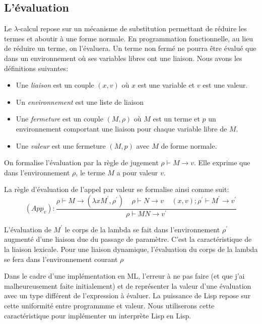 \documentclass[11pt]{book}
\begin{document}
\subsection{L'évaluation}
Le $\lambda$-calcul repose sur un mécanisme de substitution permettant de réduire les termes et
aboutir à une forme normale. En programmation fonctionnelle, au lieu de réduire un terme, on
l'évaluera. Un terme non fermé ne pourra être évalué que dans un environnement où ses 
variables libres ont une liaison. Nous avons les définitions suivantes:
\begin{itemize}
	\item Une \textit{liaison} est un couple $(x,v)$ où $x$ est une variable et $v$ est une valeur.
	\item Un \textit{environnement} est une liste de liaison
	\item Une \textit{fermeture} est un couple $(M,\rho)$ où $M$ est un terme et $p$ un environnement 
	comportant une liaison pour chaque variable libre de $M$.
	\item Une \textit{valeur} est une fermeture $(M,p)$ avec $M$ de forme normale.
\end{itemize}
On formalise l'évaluation par la règle de jugement $\rho \vdash M \rightarrow v$. Elle exprime
que dans l'environnement $\rho$, le terme $M$ a pour valeur $v$.

La règle d'évaluation de l'appel par valeur se formalise ainsi comme suit:
\[(App_v): \frac{\rho \vdash M \rightarrow (\lambda x M^{'} , \rho ^{'} )  
		\ \ \ \ \ \rho \vdash N \rightarrow v \ \ \ \ \ (x,v);\rho ^{'} \vdash M^{'} \rightarrow v^{'} }
		 { \rho \vdash M N \rightarrow v^{'} }
\]


L'évaluation de $M^{'}$ le corps de la lambda se fait dans l'environnement $\rho ^{'}$ augmenté 
d'une liaison due du passage de paramètre. C'est la caractéristique de la liaison lexicale.
Pour  une liaison dynamique, l'évaluation du corps de la lambda se fera  dans l'environnement
courant $\rho$

Dans le cadre d'une implémentation en ML, l'erreur à ne pas faire (et que j'ai malheureusement faite initialement) et de
représenter la valeur d'une évaluation avec un type différent de l'expression à évaluer.
La puissance de Lisp repose sur  cette uniformité entre programmme et valeur. Nous utiliserons cette caractéristique pour
implémenter un interprète Lisp en Lisp.
\end{document}
